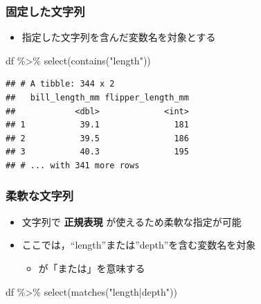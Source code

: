 \documentclass[
  xelatex,ja=standard, b5paper]{bxjsbook}
\newenvironment{Shaded}{\begin{snugshade}}{\end{snugshade}}
\newcommand{\FunctionTok}[1]{\textcolor[rgb]{0.00,0.00,0.00}{#1}}
\newcommand{\NormalTok}[1]{#1}
\newcommand{\SpecialCharTok}[1]{\textcolor[rgb]{0.00,0.00,0.00}{#1}}
\newcommand{\StringTok}[1]{\textcolor[rgb]{0.31,0.60,0.02}{#1}}
\providecommand{\tightlist}{%
  \setlength{\itemsep}{0pt}\setlength{\parskip}{0pt}}
\begin{document}
\hypertarget{ux56faux5b9aux3057ux305fux6587ux5b57ux5217}{%
\subsubsection{固定した文字列}\label{ux56faux5b9aux3057ux305fux6587ux5b57ux5217}}

\begin{itemize}
\tightlist
\item
  指定した文字列を含んだ変数名を対象とする
\end{itemize}

\begin{Shaded}
\begin{Highlighting}[]
\NormalTok{df }\SpecialCharTok{\%\textgreater{}\%}
  \FunctionTok{select}\NormalTok{(}\FunctionTok{contains}\NormalTok{(}\StringTok{"length"}\NormalTok{))}
\end{Highlighting}
\end{Shaded}

\begin{verbatim}
## # A tibble: 344 x 2
##   bill_length_mm flipper_length_mm
##            <dbl>             <int>
## 1           39.1               181
## 2           39.5               186
## 3           40.3               195
## # ... with 341 more rows
\end{verbatim}

\hypertarget{select-helper4}{%
\subsubsection{柔軟な文字列}\label{select-helper4}}

\begin{itemize}
\tightlist
\item
  文字列で \textbf{正規表現} が使えるため柔軟な指定が可能
\item
  ここでは，``length''または''depth''を含む変数名を対象

  \begin{itemize}
  \tightlist
  \item
    \texttt{\textbar{}}が「または」を意味する
  \end{itemize}
\end{itemize}

\begin{Shaded}
\begin{Highlighting}[]
\NormalTok{df }\SpecialCharTok{\%\textgreater{}\%}
  \FunctionTok{select}\NormalTok{(}\FunctionTok{matches}\NormalTok{(}\StringTok{"length|depth"}\NormalTok{))}
\end{Highlighting}
\end{Shaded}
\end{document}
